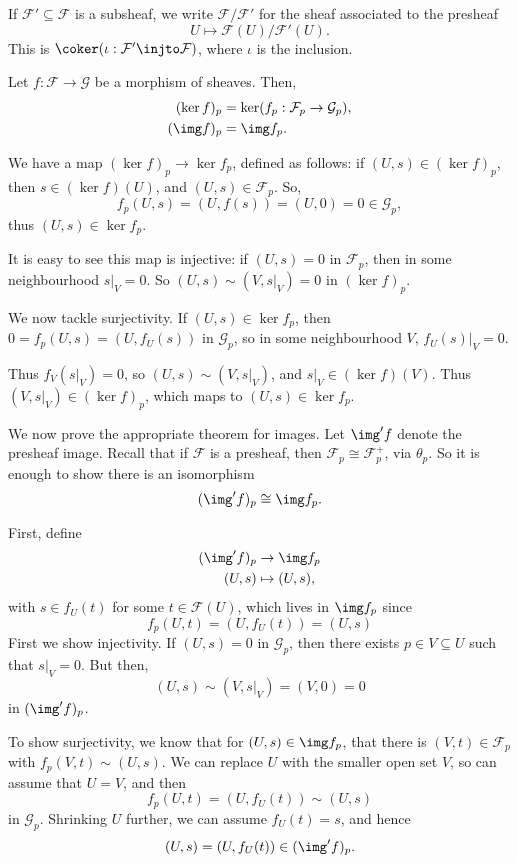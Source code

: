\documentclass[12pt]{article}
\begin{document}
If $\mathcal{F}' \subseteq \mathcal{F}$ is a subsheaf, we write $\mathcal{F} / \mathcal{F}'$ for the sheaf associated to the presheaf
\[
U \mapsto \mathcal{F}(U) / \mathcal{F}'(U).
\]
This is $\coker (\iota : \mathcal{F}' \injto \mathcal{F})$, where $\iota$ is the inclusion.

\begin{lemma}
	Let $f : \mathcal{F} \to \mathcal{G}$ be a morphism of sheaves. Then,
	\begin{align*}
		(\ker f)_p &= \ker (f_p : \mathcal{F}_p \to \mathcal{G}_p), \\
		(\img f)_p &= \img f_p.
	\end{align*}
\end{lemma}

\begin{proofbox}
	We have a map $(\ker f)_p \to \ker f_p$, defined as follows: if $(U, s) \in (\ker f)_p$, then $s \in (\ker f)(U)$, and $(U, s) \in \mathcal{F}_p$. So,
	\[
	f_p (U, s) = (U, f(s)) = (U, 0) = 0 \in \mathcal{G}_p,
	\]
	thus $(U, s) \in \ker f_p$.

	It is easy to see this map is injective: if $(U, s) = 0$ in $\mathcal{F}_p$, then in some neighbourhood $s|_V = 0$. So $(U, s) \sim (V, s|_V) = 0$ in $(\ker f)_p$.

	We now tackle surjectivity. If $(U, s) \in \ker f_p$, then $0 = f_p(U, s) = (U, f_U(s))$ in $\mathcal{G}_p$, so in some neighbourhood $V$, $f_U(s)|_V = 0$.

	Thus $f_V(s|_V) = 0$, so $(U, s) \sim (V, s|_V)$, and $s|_V \in (\ker f)(V)$. Thus $(V, s|_V) \in (\ker f)_p$, which maps to $(U, s) \in \ker f_p$.

	We now prove the appropriate theorem for images. Let $\img' f$ denote the presheaf image. Recall that if $\mathcal{F}$ is a presheaf, then $\mathcal{F}_p \cong \mathcal{F}_p^+$, via $\theta_p$. So it is enough to show there is an isomorphism
	\[
		(\img' f)_p \cong \img f_p.
	\]

	First, define
	\begin{align*}
		(\img' f)_p &\to \img f_p \\
		(U, s) &\mapsto (U, s),
	\end{align*}
	with $s \in f_U(t)$ for some $t \in \mathcal{F}(U)$, which lives in $\img f_p$ since
	\[
	f_p(U, t) = (U, f_U(t)) = (U, s)
	\]
	First we show injectivity. If $(U, s) = 0$ in $\mathcal{G}_p$, then there exists $p \in V \subseteq U$ such that $s|_V = 0$. But then,
	\[
		(U, s) \sim (V, s|_V) = (V, 0) = 0
	\]
	in $(\img ' f)_p$.

	To show surjectivity, we know that for $(U, s) \in \img f_p$, that there is $(V, t) \in \mathcal{F}_p$ with $f_p(V, t) \sim (U, s)$. We can replace $U$ with the smaller open set $V$, so can assume that $U = V$, and then
	\[
	f_p(U, t) = (U, f_U(t)) \sim (U, s)
	\]
	in $\mathcal{G}_p$. Shrinking $U$ further, we can assume $f_U(t) = s$, and hence
	\[
		(U, s) = (U, f_U(t)) \in (\img ' f)_p.
	\]
\end{proofbox}
\end{document}
